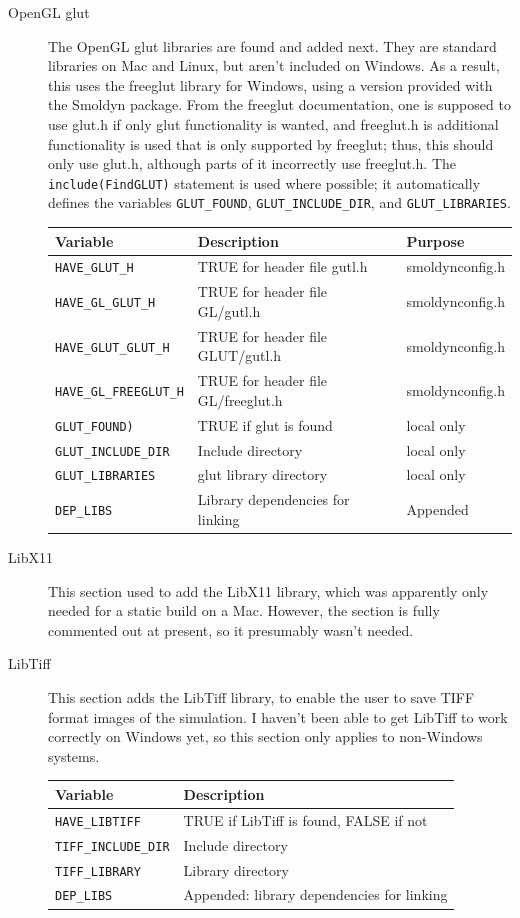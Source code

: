\documentclass {scrbook}
\newcommand {\ttt} {\texttt}
\begin{document}
\begin{description}
\item[OpenGL glut]
The OpenGL glut libraries are found and added next. They are standard libraries on Mac and Linux, but aren't included on Windows. As a result, this uses the freeglut library for Windows, using a version provided with the Smoldyn package. From the freeglut documentation, one is supposed to use glut.h if only glut functionality is wanted, and freeglut.h is additional functionality is used that is only supported by freeglut; thus, this should only use glut.h, although parts of it incorrectly use freeglut.h. The \ttt{include(FindGLUT)} statement is used where possible; it automatically defines the variables \ttt{GLUT\_FOUND}, \ttt{GLUT\_INCLUDE\_DIR}, and \ttt{GLUT\_LIBRARIES}.
\begin{longtable}[c]{lll}
Variable & Description & Purpose\\
\hline
\ttt{HAVE\_GLUT\_H} & TRUE for header file gutl.h  & smoldynconfig.h\\
\ttt{HAVE\_GL\_GLUT\_H} & TRUE for header file GL/gutl.h  & smoldynconfig.h\\
\ttt{HAVE\_GLUT\_GLUT\_H} & TRUE for header file GLUT/gutl.h  & smoldynconfig.h\\
\ttt{HAVE\_GL\_FREEGLUT\_H} & TRUE for header file GL/freeglut.h  & smoldynconfig.h\\
\ttt{GLUT\_FOUND)} & TRUE if glut is found & local only\\
\ttt{GLUT\_INCLUDE\_DIR} & Include directory & local only\\
\ttt{GLUT\_LIBRARIES} & glut library directory & local only\\
\ttt{DEP\_LIBS} & Library dependencies for linking & Appended\\
\end{longtable}

\item[LibX11]
This section used to add the LibX11 library, which was apparently only needed for a static build on a Mac. However, the section is fully commented out at present, so it presumably wasn't needed.

\item[LibTiff]
This section adds the LibTiff library, to enable the user to save TIFF format images of the simulation. I haven't been able to get LibTiff to work correctly on Windows yet, so this section only applies to non-Windows systems.
\begin{longtable}[c]{ll}
Variable & Description\\
\hline
\ttt{HAVE\_LIBTIFF} & TRUE if LibTiff is found, FALSE if not\\
\ttt{TIFF\_INCLUDE\_DIR} & Include directory\\
\ttt{TIFF\_LIBRARY} & Library directory\\
\ttt{DEP\_LIBS} & Appended: library dependencies for linking\\
\end{longtable}


\end{description}
\end{document}
